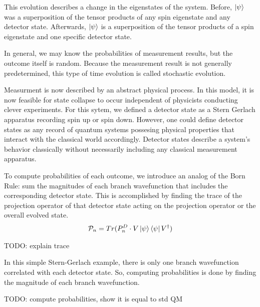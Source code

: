 This evolution describes a change in the eigenstates of the system. Before, $\ket{\psi}$ was a superposition of the tensor products of any spin eigenstate and any detector state. Afterwards, $\ket{\psi}$ is a superposition of the tensor products of a spin eigenstate and one specific detector state.

In general, we may know the probabilities of measurement results, but the outcome itself is random. Because the measurement result is not generally predetermined, this type of time evolution is called stochastic evolution.

Measurment is now described by an abstract physical process. In this model, it is now feasible for state collapse to occur independent of physicists conducting clever experiments. For this sytem, we defined a detector state as a Stern Gerlach apparatus recording spin up or spin down. However, one could define detector states as any record of quantum systems possesing physical properties that interact with the classical world accordingly. Detector states describe a system's behavior classically without necessarily including any classical measurement apparatus.

To compute probabilities of each outcome, we introduce an analog of the Born Rule: sum the magnitudes of each branch wavefunction that includes the corresponding detector state. This is accomplished by finding the trace of the projection operator of that detector state acting on the projection operator or the overall evolved state.
\begin{align}
    \mathcal{P}_n = Tr(P^D_n \cdot V\ket{\psi}\bra{\psi}V^\dagger)
\end{align}

TODO: explain trace

In this simple Stern-Gerlach example, there is only one branch wavefunction correlated with each detector state. So, computing probabilities is done by finding the magnitude of each branch wavefunction.

TODO: compute probabilities, show it is equal to std QM

